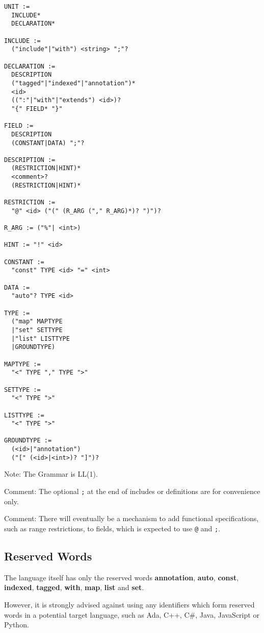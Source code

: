 \documentclass[a4paper,10pt]{article}
\begin{document}
\begin{verbatim}
UNIT :=
  INCLUDE*
  DECLARATION*

INCLUDE := 
  ("include"|"with") <string> ";"?

DECLARATION :=
  DESCRIPTION
  ("tagged"|"indexed"|"annotation")*
  <id>
  ((":"|"with"|"extends") <id>)?
  "{" FIELD* "}"
  
FIELD :=
  DESCRIPTION
  (CONSTANT|DATA) ";"?
  
DESCRIPTION := 
  (RESTRICTION|HINT)*
  <comment>?
  (RESTRICTION|HINT)*
  
RESTRICTION :=
  "@" <id> ("(" (R_ARG ("," R_ARG)*)? ")")?
  
R_ARG := ("%"| <int>)

HINT := "!" <id>
  
CONSTANT :=
  "const" TYPE <id> "=" <int>
  
DATA :=
  "auto"? TYPE <id>
  
TYPE :=
  ("map" MAPTYPE
  |"set" SETTYPE
  |"list" LISTTYPE
  |GROUNDTYPE)
  
MAPTYPE :=
  "<" TYPE "," TYPE ">"
  
SETTYPE :=
  "<" TYPE ">"
  
LISTTYPE :=
  "<" TYPE ">"
  
GROUNDTYPE :=
  (<id>|"annotation")
  ("[" (<id>|<int>)? "]")?

\end{verbatim}
Note: The Grammar is LL(1).

Comment: The optional \texttt{;} at the end of includes or definitions are for convenience only.

Comment: There will eventually be a mechanism to add functional specifications, such as range restrictions, to fields, which is expected to use \texttt{@} and \texttt{;}.

\subsection{Reserved Words}

The language itself has only the reserved words \textbf{annotation}, \textbf{auto}, \textbf{const}, \textbf{indexed}, \textbf{tagged}, \textbf{with}, \textbf{map}, \textbf{list} and \textbf{set}.

However, it is strongly advised against using any identifiers which form reserved words in a potential target language, such as Ada, C++, C\#, Java, JavaScript or Python.
\end{document}
